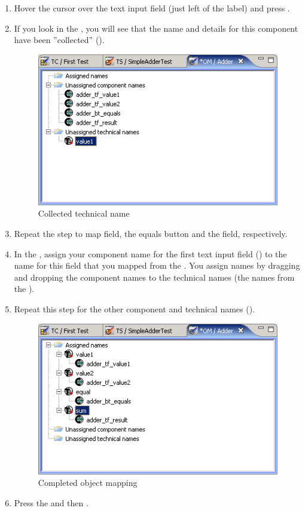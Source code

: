 \begin{enumerate}
\item Hover the cursor over the  text input field 
(just left of the  label) and press
. 
\item If you look in the \gdomeditor{}, you will see that the name and details for this component have been ''collected'' ().
\begin{figure}[h]
\begin{center}
\includegraphics{Tutorials/PS/TutCollectName1}
\caption{Collected technical name}
\label{TutCollectName1}
\end{center}
\end{figure}

 
\item Repeat the step to map  field, the equals button and the  field,
respectively.
\item In the \gdomeditor{}, assign your component name for the first text input field () to the name for this field that you mapped from the \gdaut{}. You assign names by dragging and dropping the component names to the technical names (the names from the \gdaut{}).
\item Repeat this step for the other component and technical names ().
\begin{figure}[h]
\begin{center}
\includegraphics{Tutorials/PS/TutOM}
\caption{Completed object mapping}
\label{TutOM}
\end{center}
\end{figure}
 
\item Press the  and then . 
\end{enumerate}




